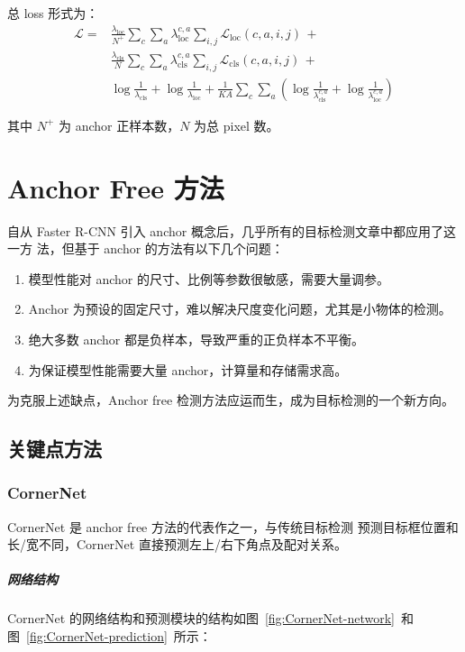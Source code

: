 总 loss 形式为：
\begin{align}
  \mathcal{L} = & \frac{\lambda_{\mathrm{loc}}}{N^+}\sum_c \sum_a \lambda_{\mathrm{loc}}^{c,a} \sum_{i, j}\mathcal{L}_{\mathrm{loc}}(c,a,i,j) \, + \\
                & \frac{\lambda_{\mathrm{cls}}}{N}\sum_c \sum_a \lambda_{\mathrm{cls}}^{c,a} \sum_{i, j}\mathcal{L}_{\mathrm{cls}}(c,a,i,j) \, + \\
                & \log\frac{1}{\lambda_{\mathrm{cls}}} + \log\frac{1}{\lambda_{\mathrm{loc}}} + \frac{1}{KA}\sum_{c}\sum_{a}\left( \log\frac{1}{\lambda_{\mathrm{cls}}^{c,a}} + \log\frac{1}{\lambda_{\mathrm{loc}}^{c,a}} \right)
\end{align}

其中 $N^+$ 为 anchor 正样本数，$N$ 为总 pixel 数。

\chapter{Anchor Free 方法}
自从 Faster R-CNN 引入 anchor 概念后，几乎所有的目标检测文章中都应用了这一方
法，但基于 anchor 的方法有以下几个问题：

\begin{enumerate}
  \item 模型性能对 anchor 的尺寸、比例等参数很敏感，需要大量调参。
  \item Anchor 为预设的固定尺寸，难以解决尺度变化问题，尤其是小物体的检测。
  \item 绝大多数 anchor 都是负样本，导致严重的正负样本不平衡。
  \item 为保证模型性能需要大量 anchor，计算量和存储需求高。
\end{enumerate}

为克服上述缺点，Anchor free 检测方法应运而生，成为目标检测的一个新方向。

\section{关键点方法}

\subsection{CornerNet}\label{sec:CornerNet}
CornerNet\cite{2018-CornerNet} 是 anchor free 方法的代表作之一，与传统目标检测
预测目标框位置和长/宽不同，CornerNet 直接预测左上/右下角点及配对关系。

\paragraph{网络结构}
CornerNet 的网络结构和预测模块的结构如图~\ref{fig:CornerNet-network}~和图~\ref{fig:CornerNet-prediction}~所示：

